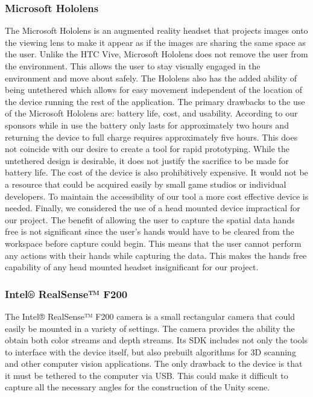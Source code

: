 \documentclass[12pt]{article}
\begin{document}
\subsubsection{Microsoft Hololens}\label{microsoft-hololens}

The Microsoft Hololens is an augmented reality headset that projects
images onto the viewing lens to make it appear as if the images are
sharing the same space as the user. Unlike the HTC Vive, Microsoft
Hololens does not remove the user from the environment. This allows the
user to stay visually engaged in the environment and move about safely.
The Hololens also has the added ability of being untethered which allows
for easy movement independent of the location of the device running the
rest of the application. The primary drawbacks to the use of the
Microsoft Hololens are: battery life, cost, and usability. According to
our sponsors while in use the battery only lasts for approximately two
hours and returning the device to full charge requires approximately
five hours. This does not coincide with our desire to create a tool for
rapid prototyping. While the untethered design is desirable, it does not
justify the sacrifice to be made for battery life. The cost of the
device is also prohibitively expensive. It would not be a resource that
could be acquired easily by small game studios or individual developers.
To maintain the accessibility of our tool a more cost effective device
is needed. Finally, we considered the use of a head mounted device
impractical for our project. The benefit of allowing the user to capture
the spatial data hands free is not significant since the user's hands
would have to be cleared from the workspace before capture could begin.
This means that the user cannot perform any actions with their hands
while capturing the data. This makes the hands free capability of any
head mounted headset insignificant for our project.

\subsubsection{Intel® RealSense™ F200}\label{intel-realsense-f200}

The Intel® RealSense™ F200 camera is a small rectangular camera that
could easily be mounted in a variety of settings. The camera provides
the ability the obtain both color streams and depth streams. Its SDK
includes not only the tools to interface with the device itself, but
also prebuilt algorithms for 3D scanning and other computer vision
applications. The only drawback to the device is that it must be
tethered to the computer via USB. This could make it difficult to
capture all the necessary angles for the construction of the Unity
scene.
\end{document}
